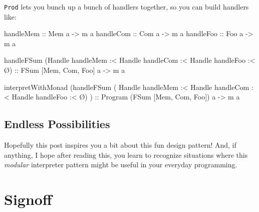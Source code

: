 \documentclass[]{article}
\newenvironment{Shaded}{}{}
\newcommand{\DataTypeTok}[1]{\textcolor[rgb]{0.56,0.13,0.00}{#1}}
\newcommand{\NormalTok}[1]{#1}
\newcommand{\OperatorTok}[1]{\textcolor[rgb]{0.40,0.40,0.40}{#1}}
\newcommand{\OtherTok}[1]{\textcolor[rgb]{0.00,0.44,0.13}{#1}}
\begin{document}
\texttt{Prod} lets you bunch up a bunch of handlers together, so you can build
handlers like:

\begin{Shaded}
\begin{Highlighting}[]
\OtherTok{handleMem ::} \DataTypeTok{Mem}\NormalTok{ a }\OtherTok{{-}\textgreater{}}\NormalTok{ m a}
\OtherTok{handleCom ::} \DataTypeTok{Com}\NormalTok{ a }\OtherTok{{-}\textgreater{}}\NormalTok{ m a}
\OtherTok{handleFoo ::} \DataTypeTok{Foo}\NormalTok{ a }\OtherTok{{-}\textgreater{}}\NormalTok{ m a}

\NormalTok{handleFSum (}\DataTypeTok{Handle}\NormalTok{ handleMem }\OperatorTok{:\textless{}} \DataTypeTok{Handle}\NormalTok{ handleCom }\OperatorTok{:\textless{}} \DataTypeTok{Handle}\NormalTok{ handleFoo }\OperatorTok{:\textless{}}\NormalTok{ Ø)}
\OtherTok{    ::} \DataTypeTok{FSum}\NormalTok{ \textquotesingle{}[}\DataTypeTok{Mem}\NormalTok{, }\DataTypeTok{Com}\NormalTok{, }\DataTypeTok{Foo}\NormalTok{] a }\OtherTok{{-}\textgreater{}}\NormalTok{ m a}

\NormalTok{interpretWithMonad}
\NormalTok{        (handleFSum ( }\DataTypeTok{Handle}\NormalTok{ handleMem}
                   \OperatorTok{:\textless{}} \DataTypeTok{Handle}\NormalTok{ handleCom}
                   \OperatorTok{:\textless{}} \DataTypeTok{Handle}\NormalTok{ handleFoo}
                   \OperatorTok{:\textless{}}\NormalTok{ Ø)}
\NormalTok{        )}
\OtherTok{    ::} \DataTypeTok{Program}\NormalTok{ (}\DataTypeTok{FSum}\NormalTok{ \textquotesingle{}[}\DataTypeTok{Mem}\NormalTok{, }\DataTypeTok{Com}\NormalTok{, }\DataTypeTok{Foo}\NormalTok{]) a }\OtherTok{{-}\textgreater{}}\NormalTok{ m a}
\end{Highlighting}
\end{Shaded}

\subsection{Endless Possibilities}\label{endless-possibilities}

Hopefully this post inspires you a bit about this fun design pattern! And, if
anything, I hope after reading this, you learn to recognize situations where
this \emph{modular} interpreter pattern might be useful in your everyday
programming.

\section{Signoff}\label{signoff}
\end{document}
